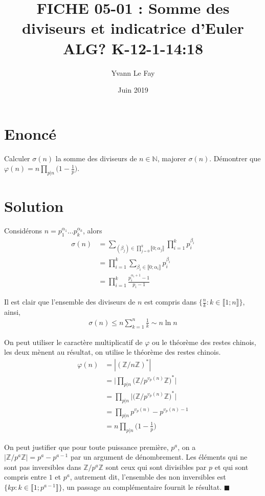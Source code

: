\documentclass{article}
\newcommand*{\QED}{\hfill\ensuremath{\blacksquare}}%
\begin{document}
\title{FICHE 05-01 : Somme des diviseurs et indicatrice d'Euler ALG? K-12-1-14:18}
\author{Yvann Le Fay}
\date{Juin 2019}
\maketitle

\section*{Enoncé}
Calculer $\sigma(n)$ la somme des diviseurs de $n\in \mathbb{N}$, majorer $\sigma(n)$. Démontrer que $\varphi(n) = \displaystyle n\prod_{p|n}\bigg(1-\frac{1}{p}\bigg)$.
\section*{Solution}
Considérons $n=p_1^{\alpha_1}\ldots p_k^{\alpha_k}$, alors
\begin{align*}
\sigma(n) &= \sum_{(\beta_j)\in \prod_{j=0}^{k}\llbracket 0;\alpha_j\rrbracket}\prod_{i=1}^k p_i^{\beta_i}\\
&=\prod_{i=1}^k \sum_{\beta_i\in\llbracket 0;\alpha_i\rrbracket}{p_i^{\beta_i}}\\
&=\prod_{i=1}^k \frac{p_i^{\alpha_i+1}-1}{p_i-1}
\end{align*}

Il est clair que l'ensemble des diviseurs de $n$ est compris dans $\{\frac{n}{k} : k\in\llbracket 1;n\rrbracket\}$, ainsi, 
\begin{align*}
\sigma(n)\leq n\sum_{k=1}^n \frac{1}{k}\sim n \ln{n}
\end{align*}

On peut utiliser le caractère multiplicatif de $\varphi$ ou le théorème des restes chinois, les deux mènent au résultat, on utilise le théorème des restes chinois. 
\begin{align*}
\varphi(n) &= |(\mathbb{Z}/{n\mathbb{Z}})^*|\\
&= \bigg|\prod_{p|n}\bigg(\mathbb{Z}/{p^{v_p(n)}\mathbb{Z}}\bigg)^*\bigg|\\
&=\prod_{p|n}\bigg|\bigg(\mathbb{Z}/{p^{v_p(n)}\mathbb{Z}}\bigg)^*\bigg|\\
&=\prod_{p|n}p^{v_p(n)}-p^{v_p(n)-1}\\
&=n\prod_{p|n}\bigg(1-\frac{1}{p}\bigg)
\end{align*}

On peut justifier que pour toute puissance première, $p^a$, on a $|\mathbb{Z}/{p^a\mathbb{Z}}| = p^a - p^{a-1}$ par un argument de dénombrement. Les éléments qui ne sont pas inversibles dans $\mathbb{Z}/{p^a\mathbb{Z}}$ sont ceux qui sont divisibles par $p$ et qui sont compris entre $1$ et $p^a$, autrement dit, l'ensemble des non inversibles est $\{kp : k\in\llbracket 1;p^{a-1}\rrbracket\}$, un passage au complémentaire fournit le résultat.
\QED
\end{document}
